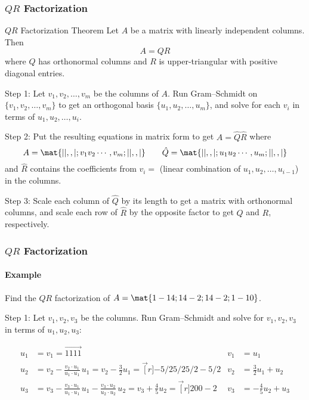 \begin{frame}
\frametitle{$QR$ Factorization}

\vskip-3mm
\begin{oneoffthm}{$QR$ Factorization Theorem}
  Let $A$ be a matrix with linearly independent columns.  Then
  \[ A = QR \]
  where $Q$ has orthonormal columns and $R$ is upper-triangular with positive
  diagonal entries.
\end{oneoffthm}

\pause\medskip
\alert{Step 1:} Let $v_1,v_2,\ldots,v_m$ be the columns of $A$.
Run Gram--Schmidt on $\{v_1,v_2,\ldots,v_m\}$ to get an orthogonal
basis $\{u_1,u_2,\ldots,u_m\}$, and solve for each $v_i$
in terms of $u_1,u_2,\ldots,u_i$.

\pause\medskip
\alert{Step 2:} Put the resulting equations in matrix form to get
$A = \hat Q\hat R$ where
\displayskips{2pt}
\[ A = \mat{| | ,, |; v_1 v_2 \cdots, v_m; | | ,, |}
\qquad
\hat Q = \mat{| | ,, |; u_1 u_2 \cdots, u_m; | | ,, |} \]
and $\hat R$ contains the coefficients from
$v_i =$ (linear combination of $u_1,u_2,\ldots,u_{i-1}$) in the columns.

\pause\medskip
\alert{Step 3}: Scale each column of $\hat Q$ by its length to get a matrix with
orthonormal columns, and scale each row of $\hat R$ by the opposite factor to
get $Q$ and $R$, respectively.

\end{frame}



\begin{frame}
\frametitle{$QR$ Factorization}
\framesubtitle{Example}

Find the $QR$ factorization of
$A = \mat{1 -1 4; 1 4 -2; 1 4 -2; 1 -1 0}$.

\pause\smallskip\alert{Step 1:}
Let $v_1,v_2,v_3$ be the columns.
Run Gram--Schmidt and solve
for $v_1,v_2,v_3$ in terms of $u_1,u_2,u_3$:
\begin{webonly}
\[\begin{aligned}
 u_1 &= v_1 = \vec{1 1 1 1}  & v_1 &= u_1 \\
 u_2 &= v_2 - \frac{v_2\cdot u_1}{u_1\cdot u_1}\,u_1
  = v_2 - \frac{3}{2}u_1
  = \vec[r]{-5/2 5/2 5/2 -5/2}
  & v_2 &= \frac 32u_1 + u_2 \\
 u_3 &= v_3
  - \frac{v_3\cdot u_1}{u_1\cdot u_1}\,u_1
  - \frac{v_3\cdot u_2}{u_2\cdot u_2}\,u_2 
  = v_3
  + \frac{4}{5}u_2
  = \vec[r]{2 0 0 -2} 
  & v_3 &= -\frac 45u_2 + u_3
\end{aligned}\]

\end{webonly}

\end{frame}


